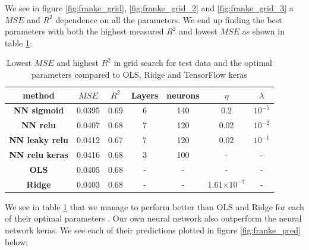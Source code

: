 \documentclass[11pt]{article}
\begin{document}
We see in figure \ref{fig:franke_grid}, \ref{fig:franke_grid_2} and \ref{fig:franke_grid_3} a $MSE$ and $R^2$ dependence on all the parameters. We end up finding the best parameters with both the highest measured $R^2$ and lowest $MSE$ as shown in table \ref{tab:franke_best}:
\begin{table}[H]
    \centering
    \caption{Lowest $MSE$ and highest $R^2$ in grid search for test data and the optimal parameters compared to OLS, Ridge and TensorFlow keras}
    \label{tab:franke_best}
    \begin{tabular}{|c|c|c|c|c|c|c|}
        \hline
        method                 & $MSE$  & $R^2$ & Layers & neurons & $\eta$                & $\lambda$ \\
        \hline
        \textbf{NN sigmoid}    & 0.0395 & 0.69  & 6      & 140     & 0.2                   & $10^{-5}$ \\\hline
        \textbf{NN relu}       & 0.0407 & 0.68  & 7      & 120     & 0.02                  & $10^{-2}$ \\\hline
        \textbf{NN leaky relu} & 0.0412 & 0.67  & 7      & 120     & 0.02                  & $10^{-1}$ \\\hline
        \textbf{NN relu keras} & 0.0416 & 0.68  & 3      & 100     & -                     & -         \\\hline
        \textbf{OLS}           & 0.0405 & 0.68  & -      & -       & -                     & -         \\\hline
        \textbf{Ridge}         & 0.0403 & 0.68  & -      & -       & 1.61$\times 10 ^{-7}$ & -         \\
        \hline
    \end{tabular}
\end{table}
We see in table \ref{tab:franke_best} that we manage to perform better than OLS and Ridge for each of their optimal parameters \cite{project1}. Our own neural network also outperform the neural network keras. We see each of their predictions plotted in figure \ref{fig:franke_pred} below:
\end{document}
